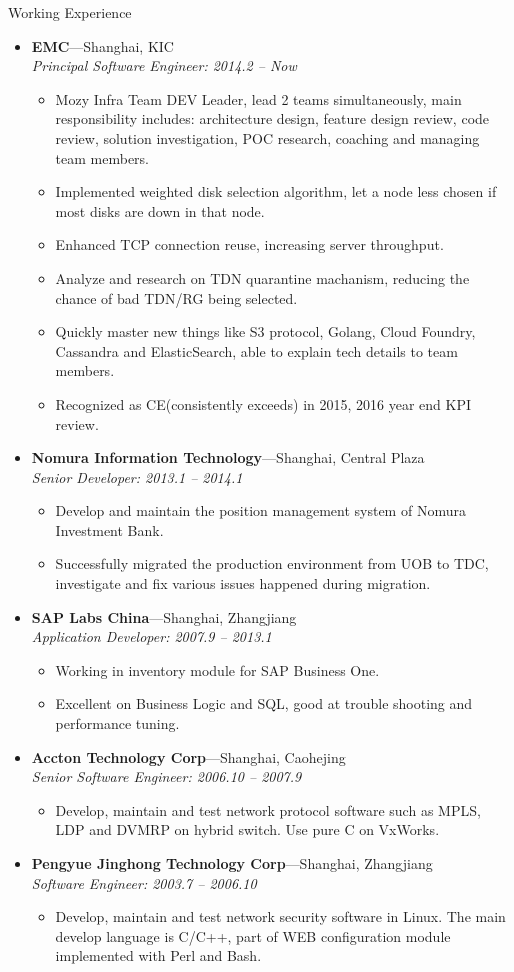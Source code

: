 \documentclass[11pt,oneside]{article}
\newenvironment{ressection}[1]{
	\vspace{4pt}
	{\selectfont\Large#1}
	\begin{itemize}
	\vspace{3pt}
}{
	\end{itemize}
}
\newcommand{\ressubitem}[1]{
	\vspace{-1pt}
	\item \begin{flushleft} #1 \end{flushleft}
}
\newcommand{\resbigitem}[3]{
	\vspace{-5pt}
	\item
	\textbf{#1}---#2 \\
	\textit{#3}
}
\newenvironment{ressubsec}[3]{
	\resbigitem{#1}{#2}{#3}
	\vspace{-2pt}
	\begin{itemize}
}{
    \end{itemize}
}
\begin{document}
\begin{ressection}{Working Experience}

	\begin{ressubsec}{EMC}{Shanghai, KIC}{Principal Software Engineer: 2014.2 -- Now}
		\ressubitem{Mozy Infra Team DEV Leader, lead 2 teams simultaneously, main responsibility includes: architecture design, feature design review, code review, solution investigation, POC research, coaching and managing team members.}
		\ressubitem{Implemented weighted disk selection algorithm, let a node less chosen if most disks are down in that node.}
		\ressubitem{Enhanced TCP connection reuse, increasing server throughput.}
		\ressubitem{Analyze and research on TDN quarantine machanism, reducing the chance of bad TDN/RG being selected.}
		\ressubitem{Quickly master new things like S3 protocol, Golang, Cloud Foundry, Cassandra and ElasticSearch, able to explain tech details to team members.}
		\ressubitem{Recognized as CE(consistently exceeds) in 2015, 2016 year end KPI review.}
	\end{ressubsec}

	\begin{ressubsec}{Nomura Information Technology}{Shanghai, Central Plaza}{Senior Developer: 2013.1 -- 2014.1}
		\ressubitem{Develop and maintain the position management system of Nomura Investment Bank.}
		\ressubitem{Successfully migrated the production environment from UOB to TDC, investigate and
					fix various issues happened during migration.}
	\end{ressubsec}

	\begin{ressubsec}{SAP Labs China}{Shanghai, Zhangjiang}{Application Developer: 2007.9 -- 2013.1}
		\ressubitem{Working in inventory module for SAP Business One.}
		\ressubitem{Excellent on Business Logic and SQL, good at trouble shooting and performance tuning.}
	\end{ressubsec}

	\begin{ressubsec}{Accton Technology Corp}{Shanghai, Caohejing}{Senior Software Engineer: 2006.10 -- 2007.9}
		\ressubitem{Develop, maintain and test network protocol software such as MPLS, LDP and DVMRP on
					hybrid switch. Use pure C on VxWorks.}
	\end{ressubsec}

	\begin{ressubsec}{Pengyue Jinghong Technology Corp}{Shanghai, Zhangjiang}{Software Engineer: 2003.7 -- 2006.10}
		\ressubitem{Develop, maintain and test network security software in Linux. The main develop
					language is C/C++, part of WEB configuration module implemented with Perl and
					Bash.}
	\end{ressubsec}

\end{ressection}
\end{document}
